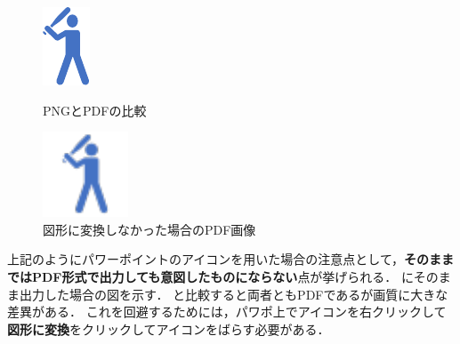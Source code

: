 \begin{figure}[t]
\begin{minipage}{0.3\linewidth}
    \includegraphics[clip, trim=0 0 0 0, width=0.5\linewidth]{figures/hit_converted.pdf}
    \label{fig: converted_pdf_img}
  \end{minipage}
  \caption{PNGとPDFの比較}
  \label{fig: png_vs_pdf}
\end{figure}
\begin{figure}[t]
    \centering
    \includegraphics[clip, width=0.3\linewidth]{figures/hit.pdf}
    \caption{図形に変換しなかった場合のPDF画像}
    \label{fig: unconverted_pdf}
\end{figure}


上記のようにパワーポイントのアイコンを用いた場合の注意点として，\textbf{そのままではPDF形式で出力しても意図したものにならない}点が挙げられる．
にそのまま出力した場合の図を示す．
と比較すると両者ともPDFであるが画質に大きな差異がある．
これを回避するためには，パワポ上でアイコンを右クリックして\textbf{図形に変換}をクリックしてアイコンをばらす必要がある．

\newpage

